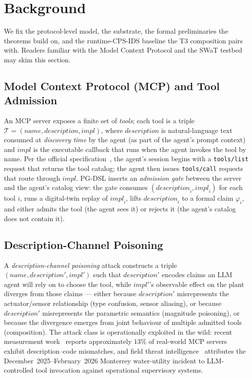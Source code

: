 \section{Background}
\label{sec:background}

We fix the protocol-level model, the substrate, the formal
preliminaries the theorems build on, and the runtime-CPS-IDS baseline
the T3 composition pairs with. Readers familiar with the Model
Context Protocol and the SWaT testbed may skim this section.

\subsection{Model Context Protocol (MCP) and Tool Admission}

An MCP server exposes a finite set of \emph{tools}; each tool is a
triple $\mathcal{T} = (\mathit{name}, \mathit{description},
\mathit{impl})$, where $\mathit{description}$ is natural-language
text consumed at \emph{discovery time} by the agent (as part of the
agent's prompt context) and $\mathit{impl}$ is the executable callback
that runs when the agent invokes the tool by name. Per the official
specification~\cite{mcp_spec}, the agent's session begins with a
\texttt{tools/list} request that returns the tool catalog; the agent
then issues \texttt{tools/call} requests that route through
$\mathit{impl}$.
PG-DSL inserts an \emph{admission gate} between the server and the
agent's catalog view: the gate consumes
$(\mathit{description}_i, \mathit{impl}_i)$ for each tool $i$, runs a
digital-twin replay of $\mathit{impl}_i$, lifts
$\mathit{description}_i$ to a formal claim $\varphi_i$, and either
admits the tool (the agent sees it) or rejects it (the agent's catalog
does not contain it).

\subsection{Description-Channel Poisoning}

A \emph{description-channel poisoning} attack constructs a triple
$(\mathit{name}, \mathit{description}', \mathit{impl}')$ such that
$\mathit{description}'$ encodes claims an LLM agent will rely on to
choose the tool, while $\mathit{impl}'$'s observable effect on the
plant diverges from those claims --- either because
$\mathit{description}'$ misrepresents
the actuator/sensor relationship (type confusion, sensor aliasing),
or because $\mathit{description}'$ misrepresents the parametric
semantics (magnitude poisoning), or because the divergence emerges
from joint behaviour of multiple admitted tools (composition).
The attack class is operationally exploited in the wild: recent
measurement work~\cite{mcp_misleading} reports approximately $13\%$
of real-world MCP servers exhibit description--code mismatches, and
field threat intelligence~\cite{dragos_mexico_26} attributes the
December~2025--February~2026 Monterrey water-utility incident to
LLM-controlled tool invocation against operational supervisory
systems.

